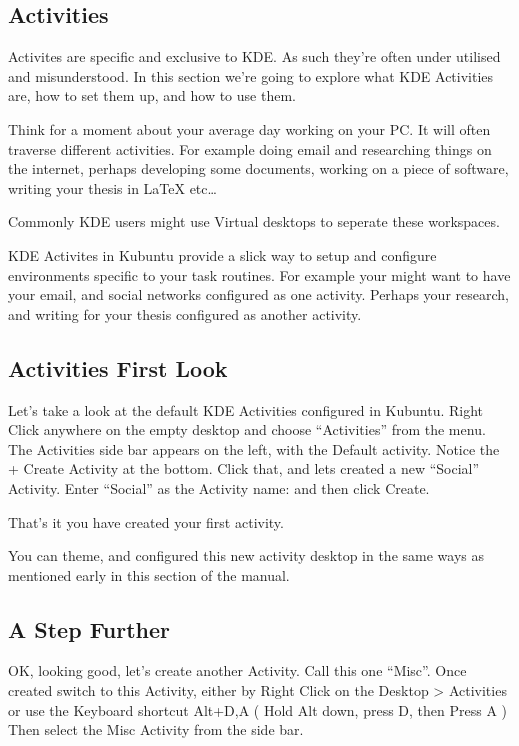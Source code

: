 \documentclass[letterpaper,10pt,english]{sphinxmanual}
\begin{document}
\subsection{Activities}
\label{\detokenize{docs/desktop-guide/advanced:activities}}
\sphinxAtStartPar
Activites are specific and exclusive to KDE. As such they’re often under utilised and misunderstood. In this section we’re going to explore what KDE Activities are, how to set them up, and how to use them.

\sphinxAtStartPar
Think for a moment about your average day working on your PC. It will often traverse different activities. For example doing email and researching things on the internet, perhaps developing some documents, working on a piece of software, writing your thesis in LaTeX etc…

\sphinxAtStartPar
Commonly KDE users might use Virtual desktops to seperate these workspaces.

\sphinxAtStartPar
KDE Activites in Kubuntu provide a slick way to setup and configure environments specific to your task routines. For example your might want to have your email, and social networks configured as one activity. Perhaps your research, and writing for your thesis configured as another activity.


\subsection{Activities First Look}
\label{\detokenize{docs/desktop-guide/advanced:activities-first-look}}

\sphinxAtStartPar
Let’s take a look at the default KDE Activities configured in Kubuntu. Right Click anywhere on the empty desktop and choose “Activities” from the menu. The Activities side bar appears on the left, with the Default activity. Notice the + Create Activity at the bottom. Click that, and lets created a new “Social” Activity.
Enter “Social” as the Activity name: and then click Create.

\sphinxAtStartPar
That’s it you have created your first activity.

\sphinxAtStartPar
You can theme, and configured this new activity desktop in the same ways as mentioned early in this section of the manual.


\subsection{A Step Further}
\label{\detokenize{docs/desktop-guide/advanced:a-step-further}}
\sphinxAtStartPar
OK, looking good, let’s create another Activity. Call this one “Misc”. Once created switch to this Activity, either by Right Click on the Desktop \textgreater{} Activities or use the Keyboard shortcut Alt+D,A ( Hold Alt down, press D, then Press A )
Then select the Misc Activity from the side bar.
\end{document}
